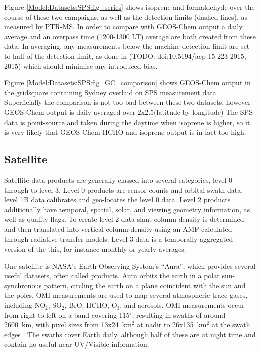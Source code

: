     Figure \ref{Model:Datasets:SPS:fig_series} shows isoprene and formaldehyde over the course of these two campaigns, as well as the detection limits (dashed lines), as measured by PTR-MS. In order to compare with GEOS-Chem output a daily average and an overpass time (1200-1300 LT) average are both created from these data.
    In averaging, any measurements below the machine detection limit are set to half of the detection limit, as done in (TODO: doi:10.5194/acp-15-223-2015, 2015) which should minimise any introduced bias.
    
    
    Figure \ref{Model:Datasets:SPS:fig_GC_comparison} shows GEOS-Chem output in the gridsquare containing Sydney overlaid on SPS measurement data.
    Superficially the comparison is not too bad between these two datasets, however GEOS-Chem output is daily averaged over 2x2.5\degr (latitude by longitude)
    The SPS data is point-source and taken during the daytime when isoprene is higher, so it is very likely that GEOS-Chem HCHO and isoprene output is in fact too high.
    
  
  \subsection{Satellite}
    \label{Model:Datasets:Aura}
    
    Satellite data products are generally classed into several categories, level 0 through to level 3. Level 0 products are sensor counts and orbital swath data, level 1B data calibrates and geo-locates the level 0 data. 
    Level 2 products additionally have temporal, spatial, solar, and viewing geometry information, as well as quality flags.
    To create level 2 data slant column density is determined and then translated into vertical column density using an AMF calculated through radiative transfer models. 
    Level 3 data is a temporally aggregated version of the this, for instance monthly or yearly averages.
    
    One satellite is NASA's Earth Observing System's ``Aura'', which provides several useful datasets, often called products.
    Aura orbits the earth in a polar sun-synchronous pattern, circling the earth on a plane coincident with the sun and the poles.
    OMI measurements are used to map several atmospheric trace gases, including NO$_2$, SO$_2$, BrO, HCHO, O$_3$, and aerosols.
    OMI measurements occur from right to left on a band covering 115$^{\circ}$, resulting in swaths of around 2600~km, with pixel sizes from 13x24~km$^2$ at nadir to 26x135~km$^2$ at the swath edges \parencite{Abad2015}.
    The swaths cover Earth daily, although half of these are at night time and contain no useful near-UV/Visible information.
    
